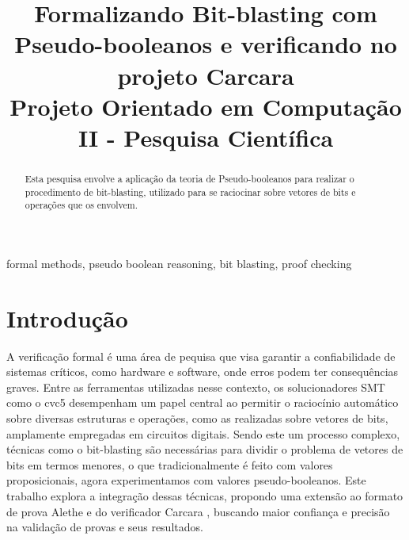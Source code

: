 \documentclass[conference]{IEEEtran}
\begin{document}
\title{Formalizando Bit-blasting com Pseudo-booleanos e verificando no projeto Carcara\\
{\footnotesize Projeto Orientado em Computação II - Pesquisa Científica}
}

\author{
}

\maketitle

\begin{abstract}
    Esta pesquisa envolve a aplicação da teoria de Pseudo-booleanos para realizar o procedimento de
    bit-blasting, utilizado para se raciocinar sobre vetores de bits e operações que os envolvem.
\end{abstract}

\begin{IEEEkeywords}
    formal methods, pseudo boolean reasoning, bit blasting, proof checking
\end{IEEEkeywords}

\section{Introdução}
A verificação formal é uma área de pequisa que visa garantir a confiabilidade de sistemas críticos,
como hardware e software, onde erros podem ter consequências graves. Entre as ferramentas utilizadas
nesse contexto, os solucionadores SMT como o cvc5\cite{Cvc5} desempenham um papel central ao permitir
o raciocínio automático sobre diversas estruturas e operações, como as realizadas sobre
vetores de bits, amplamente empregadas em circuitos digitais.
Sendo este um processo complexo, técnicas como o bit-blasting são necessárias para dividir o problema
de vetores de bits em termos menores, o que tradicionalmente é feito com valores proposicionais, agora
experimentamos com valores pseudo-booleanos.
Este trabalho explora a integração dessas técnicas, propondo uma extensão ao formato de prova Alethe \cite{Alethe}
e do verificador Carcara \cite{Carcara}, buscando maior confiança e precisão na validação de provas e seus resultados.
\end{document}
